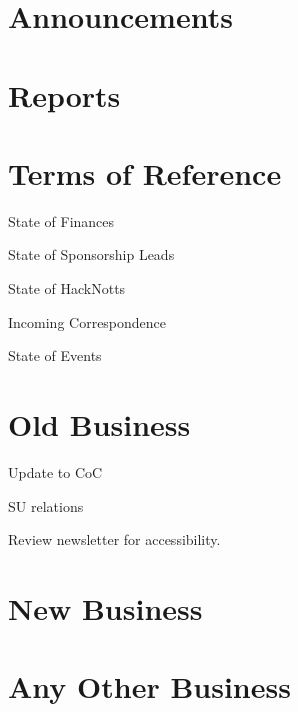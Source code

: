 \documentclass[11pt,hacksoc,agenda]{meetingmins}
\begin{document}
\maketitle

\section{Announcements}

\section{Reports}

\section{Terms of Reference}
\begin{items}
\item {State of Finances}
\item {State of Sponsorship Leads}
\item {State of HackNotts}
\item {Incoming Correspondence}
\item {State of Events}
\end{items}

\section{Old Business}
\begin{items}
\item Update to CoC 
\item SU relations
\item Review newsletter for accessibility.
\end{items}

\section{New Business}

\section{Any Other Business}

\vspace{1em}
\end{document}
